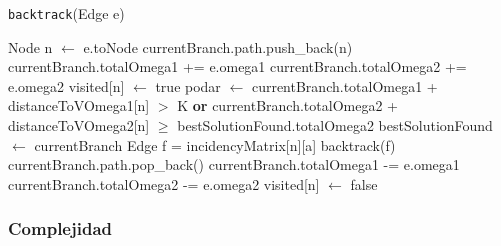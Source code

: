 \begin{algorithm}[H]
    \caption{\texttt{backtrack}(Edge e)}
\begin{algorithmic}[1]
  \State Node n $\leftarrow$ e.toNode
  \State currentBranch.path.push\_back(n)
  \State currentBranch.totalOmega1 += e.omega1
  \State currentBranch.totalOmega2 += e.omega2
  \State visited[n] $\leftarrow$ true
  \State podar $\leftarrow$ currentBranch.totalOmega1 + distanceToVOmega1[n] $>$ K \textbf{or} currentBranch.totalOmega2 + distanceToVOmega2[n] $\geq$ bestSolutionFound.totalOmega2
      \State bestSolutionFound $\leftarrow$ currentBranch
  \Else{}
          \State Edge f = incidencyMatrix[n][a]
          \State backtrack(f)
	\EndIf
      \EndFor
  \EndIf
  \EndIf
  \State currentBranch.path.pop\_back()
  \State currentBranch.totalOmega1 -= e.omega1
  \State currentBranch.totalOmega2 -= e.omega2
  \State visited[n] $\leftarrow$ false
\end{algorithmic}
\end{algorithm}

\subsubsection{Complejidad}

%
%

